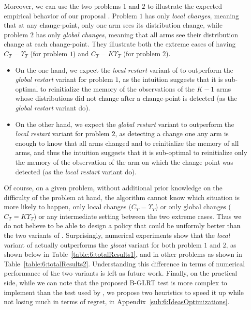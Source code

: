 Moreover, we can use the two problems $1$ and $2$ to illustrate the expected empirical behavior of our proposal \GLRklUCB.
Problem $1$ has only \emph{local changes}, meaning that at any change-point, only one arm sees its distribution change, while problem $2$ has only \emph{global changes}, meaning that all arms see their distribution change at each change-point.
They illustrate both the extreme cases of having $C_T = \Upsilon_T$ (for problem $1$) and $C_T = K \Upsilon_T$ (for problem $2$).
\begin{itemize}
    \item
On the one hand, we expect the \emph{local restart} variant of \GLRklUCB{} to outperform the \emph{global restart} variant for problem $1$, as the intuition suggests that it is sub-optimal to reinitialize the memory of the observations of the $K-1$ arms whose distributions did not change after a change-point is detected (as the \emph{global restart} variant do).
    \item
On the other hand, we expect the \emph{global restart} variant to outperform the \emph{local restart} variant for problem $2$, as detecting a change one any arm is enough to know that all arms changed and to reinitialize the memory of all arms, and thus the intuition suggests that it is sub-optimal to reinitialize only the memory of the observation of the arm on which the change-point was detected (as the \emph{local restart} variant do).
\end{itemize}
%
Of course, on a given problem, without additional prior knowledge on the difficulty of the problem at hand, the algorithm cannot know which situation is more likely to happen, only local changes ($C_T = \Upsilon_T$) or only global changes ($C_T = K \Upsilon_T$) or any intermediate setting between the two extreme cases.
Thus we do not believe to be able to design a policy that could be uniformly better than the two variants of \GLRklUCB.
%
Surprisingly, numerical experiments show that the \emph{local} variant of \GLRklUCB{} actually outperforms the \emph{glocal} variant for both problem $1$ and $2$, as shown below in Table~\ref{table:6:totalResults1}, and in other problems as shown in Table~\ref{table:6:totalResults2}.
%
Understanding this difference in terms of numerical performance of the two variants is left as future work.
%
Finally, on the practical side, while we can note that the proposed B-GLRT test is more complex to implement than the test used by \MUCB, we propose two heuristics to speed it up while not losing much in terms of regret, in Appendix~\ref{sub:6:IdeasOptimizations}.


